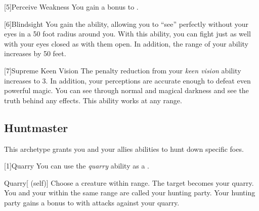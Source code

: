         [5]{Perceive Weakness}
        You gain a  bonus to .

        [6]{Blindsight}
        You gain the  ability, allowing you to ``see'' perfectly without your eyes in a 50 foot radius around you.
        With this ability, you can fight just as well with your eyes closed as with them open.
        In addition, the range of your  ability increases by 50 feet.

        [7]{Supreme Keen Vision}
        The penalty reduction from your \textit{keen vision} ability increases to 3.
        In addition, your perceptions are accurate enough to defeat even powerful magic.
        You can see through normal and magical darkness and see the truth behind any  effects.
        This ability works at any range.

    \subsection{Huntmaster}
        This archetype grants you and your allies abilities to hunt down specific foes.

        [1]{Quarry}\label{Quarry} You can use the \textit{quarry} ability as a .
        \begin{attuneability}{Quarry}[ (self)]
            Choose a creature within \rnglong range.
            The target becomes your quarry.
            You and your  within the same range are called your hunting party.
            Your hunting party gains a  bonus to  with  attacks against your quarry.
        \end{attuneability}

